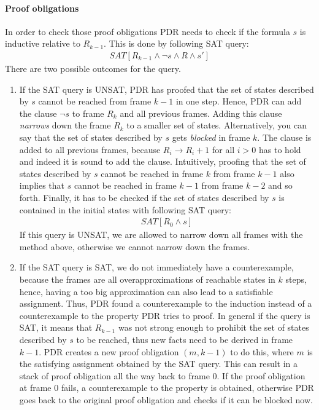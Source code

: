 \paragraph*{Proof obligations} In order to check those proof obligations PDR needs to check if the formula $s$ is inductive relative to $R_{k-1}$.
This is done by following SAT query:
\begin{align*}
SAT[R_{k-1} \wedge \lnot s \wedge R \wedge s']
\end{align*}
There are two possible outcomes for the query.
\begin{enumerate}
\item If the SAT query is UNSAT, PDR has proofed that the set of states described by $s$ cannot be reached from frame $k-1$ in one step.
Hence, PDR can add the clause $\lnot s$ to frame $R_k$ and all previous frames.
Adding this clause \emph{narrows} down the frame $R_k$ to a smaller set of states. Alternatively, you can say that the set of states described by $s$ gets \emph{blocked} in frame $k$.
The clause is added to all previous frames, because $R_i \rightarrow R_i+1$ for all $i >0$ has to hold and indeed it is sound to add the clause.
Intuitively, proofing that the set of states described by $s$ cannot be reached in frame $k$ from frame $k-1$ also implies that $s$ cannot be reached in frame $k-1$ from frame $k-2$ and so forth.
Finally, it has to be checked if the set of states described by $s$ is contained in the initial states with following SAT query:
\begin{align*}
SAT[R_0 \wedge s]
\end{align*}
If this query is UNSAT, we are allowed to narrow down all frames with the method above, otherwise we cannot narrow down the frames.
\item If the SAT query is SAT, we do not immediately have a counterexample, because the frames are all overapproximations of reachable states in $k$ steps, hence, having a too big approximation can also lead to a satisfiable assignment.
Thus, PDR found a counterexample to the induction instead of a counterexample to the property PDR tries to proof.
In general if the query is SAT, it means that $R_{k-1}$ was not strong enough to prohibit the set of states described by $s$ to be reached, thus new facts need to be derived in frame $k-1$.
PDR creates a new proof obligation $(m,k-1)$ to do this, where $m$ is the satisfying assignment obtained by the SAT query.
This can result in a stack of proof obligation all the way back to frame $0$. If the proof obligation at frame $0$ fails, a counterexample to the property is obtained, otherwise PDR goes back to the original proof obligation and checks if it can be blocked now.
\end{enumerate}
